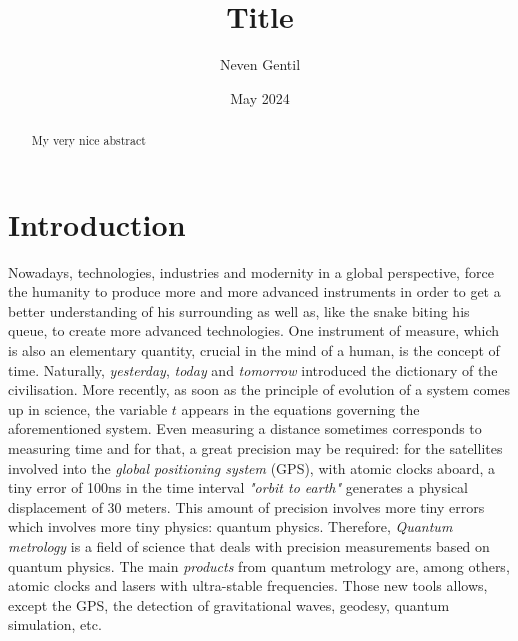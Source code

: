 \documentclass[12pt]{report}
\begin{document}
\title{Title}
\author{Neven Gentil}
\date{May 2024}
\maketitle

\begin{abstract}
My very nice abstract
\end{abstract}

\chapter{Introduction}

Nowadays, technologies, industries and modernity in a global perspective, force the humanity to produce more and more advanced instruments in order to get a better understanding of his surrounding as well as, like the snake biting his queue, to create more advanced technologies. One instrument of measure, which is also an elementary quantity, crucial in the mind of a human, is the concept of time. Naturally, \textit{yesterday}, \textit{today} and \textit{tomorrow} introduced the dictionary of the civilisation. More recently, as soon as the principle of evolution of a system comes up in science, the variable $t$ appears in the equations governing the aforementioned system. Even measuring a distance sometimes corresponds to measuring time and for that, a great precision may be required: for the satellites involved into the \textit{global positioning system} (GPS), with atomic clocks aboard, a tiny error of 100ns in the time interval \textit{"orbit to earth"} generates a physical displacement of 30 meters. This amount of precision involves more tiny errors which involves more tiny physics: quantum physics. Therefore, \textit{Quantum metrology} is a field of science that deals with precision measurements based on quantum physics. The main \textit{products} from quantum metrology are, among others, atomic clocks and lasers with ultra-stable frequencies. Those new tools allows, except the GPS, the detection of gravitational waves, geodesy, quantum simulation, etc. 
\end{document}
